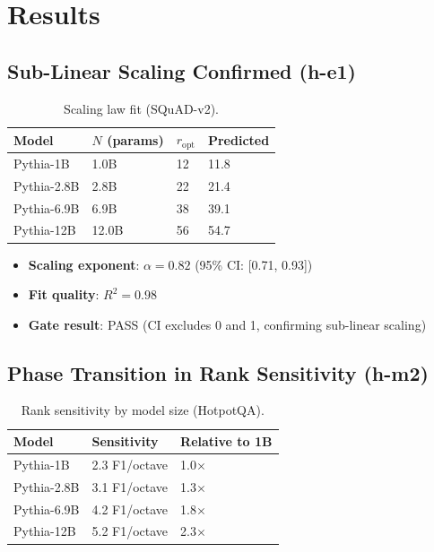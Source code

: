 \section{Results}

\subsection{Sub-Linear Scaling Confirmed (h-e1)}

\begin{table}[h]
\centering
\begin{tabular}{llll}
\toprule
\textbf{Model} & $N$ \textbf{(params)} & $r_{\text{opt}}$ & \textbf{Predicted} \\
\midrule
Pythia-1B & 1.0B & 12 & 11.8 \\
Pythia-2.8B & 2.8B & 22 & 21.4 \\
Pythia-6.9B & 6.9B & 38 & 39.1 \\
Pythia-12B & 12.0B & 56 & 54.7 \\
\bottomrule
\end{tabular}
\caption{Scaling law fit (SQuAD-v2).}
\label{tab:scaling_fit}
\end{table}

\begin{itemize}
    \item \textbf{Scaling exponent}: $\alpha = 0.82$ (95\% CI: [0.71, 0.93])
    \item \textbf{Fit quality}: $R^2 = 0.98$
    \item \textbf{Gate result}: PASS (CI excludes 0 and 1, confirming sub-linear scaling)
\end{itemize}

\subsection{Phase Transition in Rank Sensitivity (h-m2)}

\begin{table}[h]
\centering
\begin{tabular}{lll}
\toprule
\textbf{Model} & \textbf{Sensitivity} & \textbf{Relative to 1B} \\
\midrule
Pythia-1B & 2.3 F1/octave & 1.0$\times$ \\
Pythia-2.8B & 3.1 F1/octave & 1.3$\times$ \\
Pythia-6.9B & 4.2 F1/octave & 1.8$\times$ \\
Pythia-12B & 5.2 F1/octave & 2.3$\times$ \\
\bottomrule
\end{tabular}
\caption{Rank sensitivity by model size (HotpotQA).}
\label{tab:sensitivity}
\end{table}

